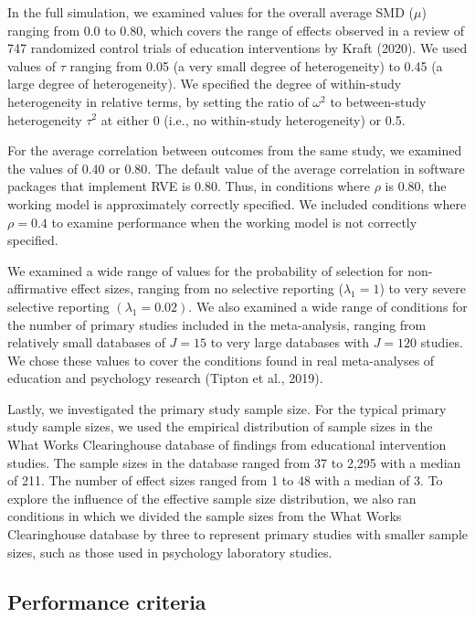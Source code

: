 \documentclass[
  american,
  man, donotrepeattitle,floatsintext]{apa7}
\begin{document}
In the full simulation, we examined values for the overall average SMD (\(\mu\)) ranging from 0.0 to 0.80, which covers the range of effects observed in a review of 747 randomized control trials of education interventions by Kraft (2020).
We used values of \(\tau\) ranging from 0.05 (a very small degree of heterogeneity) to 0.45 (a large degree of heterogeneity).
We specified the degree of within-study heterogeneity in relative terms, by setting the ratio of \(\omega^2\) to between-study heterogeneity \(\tau^2\) at either 0 (i.e., no within-study heterogeneity) or 0.5.

For the average correlation between outcomes from the same study, we
examined the values of 0.40 or 0.80. The default value of the average
correlation in software packages that implement RVE is 0.80. Thus, in
conditions where \(\rho\) is 0.80, the working model is approximately
correctly specified. We included conditions where \(\rho = 0.4\) to examine performance when the
working model is not correctly specified.

We examined a wide range of values for the probability of selection for non-affirmative effect sizes, ranging from no selective reporting (\(\lambda_1 = 1\)) to very severe selective reporting \((\lambda_1 = 0.02)\).
We also examined a wide range of conditions for the number of primary studies included in the meta-analysis, ranging from relatively small databases of \(J = 15\) to very large databases with \(J = 120\) studies.
We chose these values to cover the conditions found in real meta-analyses of education and psychology research (Tipton et al., 2019).

Lastly, we investigated the primary study sample size.
For the typical primary study sample sizes, we used the empirical distribution of sample sizes in the What Works Clearinghouse database of findings from educational intervention studies.
The sample sizes in the database ranged from 37 to 2,295 with a median of 211.
The number of effect sizes ranged from 1 to 48 with a median of 3.
To explore the influence of the effective sample size distribution, we also ran conditions in which we divided the sample
sizes from the What Works Clearinghouse database by three to represent primary studies with smaller sample sizes,
such as those used in psychology laboratory studies.

\subsection{Performance criteria}\label{performance-criteria}
\end{document}
